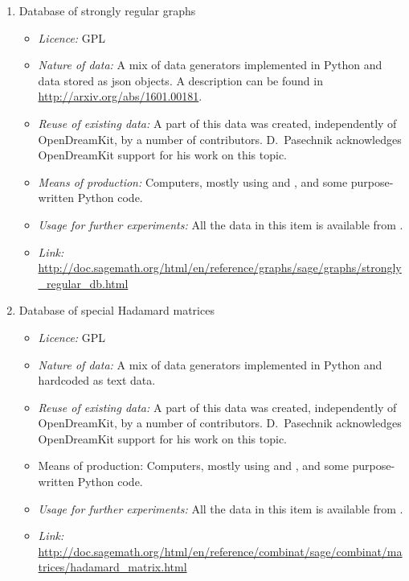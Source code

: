 \documentclass{deliverablereport}
\begin{document}
\begin{description}
\begin{enumerate}
\begin{itemize}
\end{itemize}


\item{Database of strongly regular graphs}
\begin{itemize}
\item\textit{Licence:}  GPL
\item\textit{Nature of data:} A mix of data generators implemented in Python and
data stored as json objects. A description can be found in \href{http://arxiv.org/abs/1601.00181}{http://arxiv.org/abs/1601.00181}.
\item\textit{Reuse of existing data:} A part of this data was created,
  independently of OpenDreamKit, by a number of \Sage contributors.
D.~Pasechnik acknowledges OpenDreamKit support for his work on this topic.
\item\textit{Means of production:} Computers, mostly using \Sage and \GAP, and some purpose-written
Python code.
\item\textit{Usage for further experiments:} All the data  in this item is available from \Sage.
\item\textit{Link:} \url{http://doc.sagemath.org/html/en/reference/graphs/sage/graphs/strongly_regular_db.html}
\end{itemize}


\item{Database of special Hadamard matrices}
\begin{itemize}
\item\textit{Licence:} GPL
\item\textit{Nature of data:} A mix of data generators implemented in Python and hardcoded as text data.
\item\textit{Reuse of existing data:} A part of this data was created, independently of OpenDreamKit, by
a number of \Sage contributors.
D.~Pasechnik acknowledges OpenDreamKit support for his work on this topic.
\item{Means of production:} Computers, mostly using \Sage and \GAP, and some purpose-written
Python code.
\item\textit{Usage for further experiments:} All the data  in this item is available from \Sage.
\item\textit{Link:} \url{http://doc.sagemath.org/html/en/reference/combinat/sage/combinat/matrices/hadamard_matrix.html}
\end{itemize}
\end{enumerate}
\end{description}
\end{document}
